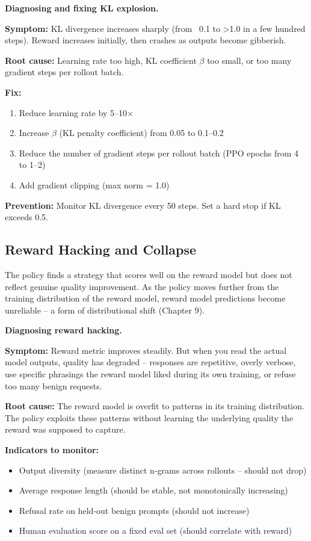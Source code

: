\begin{chapterenv}
\begin{infobox}
\textbf{Diagnosing and fixing KL explosion.}

\textbf{Symptom:} KL divergence increases sharply (from ~0.1 to >1.0 in a few hundred steps). Reward increases initially, then crashes as outputs become gibberish.

\textbf{Root cause:} Learning rate too high, KL coefficient $\beta$ too small, or too many gradient steps per rollout batch.

\textbf{Fix:}
\begin{enumerate}
\item Reduce learning rate by 5--10$\times$
\item Increase $\beta$ (KL penalty coefficient) from 0.05 to 0.1--0.2
\item Reduce the number of gradient steps per rollout batch (PPO epochs from 4 to 1--2)
\item Add gradient clipping (max norm = 1.0)
\end{enumerate}

\textbf{Prevention:} Monitor KL divergence every 50 steps. Set a hard stop if KL exceeds 0.5.
\end{infobox}

\subsection{Reward Hacking and Collapse}

The policy finds a strategy that scores well on the reward model but does not reflect genuine quality improvement. As the policy moves further from the training distribution of the reward model, reward model predictions become unreliable -- a form of distributional shift (Chapter 9).

\begin{infobox}
\textbf{Diagnosing reward hacking.}

\textbf{Symptom:} Reward metric improves steadily. But when you read the actual model outputs, quality has degraded -- responses are repetitive, overly verbose, use specific phrasings the reward model liked during its own training, or refuse too many benign requests.

\textbf{Root cause:} The reward model is overfit to patterns in its training distribution. The policy exploits these patterns without learning the underlying quality the reward was supposed to capture.

\textbf{Indicators to monitor:}
\begin{itemize}
\item Output diversity (measure distinct n-grams across rollouts -- should not drop)
\item Average response length (should be stable, not monotonically increasing)
\item Refusal rate on held-out benign prompts (should not increase)
\item Human evaluation score on a fixed eval set (should correlate with reward)
\end{itemize}


\end{infobox}
\end{chapterenv}
